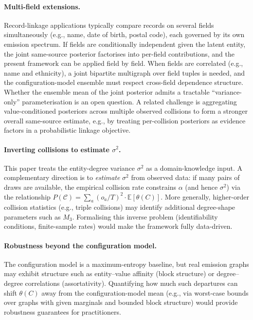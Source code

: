 \documentclass[11pt]{article}
\newcommand{\E}{\mathbb{E}}
\newcommand{\1}{\mathbf{1}}
\newcommand{\coll}{\mathcal{C}} %
\theoremstyle{plain}
\theoremstyle{definition}
\begin{document}
\paragraph{Multi-field extensions.}
Record-linkage applications typically compare records on several fields simultaneously (e.g., name, date of birth, postal code), each governed by its own emission spectrum.
If fields are conditionally independent given the latent entity, the joint same-source posterior factorises into per-field contributions, and the present framework can be applied field by field.
When fields are correlated (e.g., name and ethnicity), a joint bipartite multigraph over field tuples is needed, and the configuration-model ensemble must respect cross-field dependence structure.
Whether the ensemble mean of the joint posterior admits a tractable ``variance-only'' parameterisation is an open question.
A related challenge is aggregating value-conditioned posteriors across multiple observed collisions to form a stronger overall same-source estimate, e.g., by treating per-collision posteriors as evidence factors in a probabilistic linkage objective.

\paragraph{Inverting collisions to estimate \texorpdfstring{$\sigma^2$}{sigma-squared}.}
This paper treats the entity-degree variance $\sigma^2$ as a domain-knowledge input.
A complementary direction is to \emph{estimate} $\sigma^2$ from observed data: if many pairs of draws are available, the empirical collision rate constrains $\alpha$ (and hence $\sigma^2$) via the relationship $P(\coll)=\sum_a (o_a/T)^2 \cdot \E[\theta(C)]$.
More generally, higher-order collision statistics (e.g., triple collisions) may identify additional degree-shape parameters such as $M_3$.
Formalising this inverse problem (identifiability conditions, finite-sample rates) would make the framework fully data-driven.

\paragraph{Robustness beyond the configuration model.}
The configuration model is a maximum-entropy baseline, but real emission graphs may exhibit structure such as entity--value affinity (block structure) or degree--degree correlations (assortativity).
Quantifying how much such departures can shift $\theta(C)$ away from the configuration-model mean (e.g., via worst-case bounds over graphs with given marginals and bounded block structure) would provide robustness guarantees for practitioners.
\end{document}
